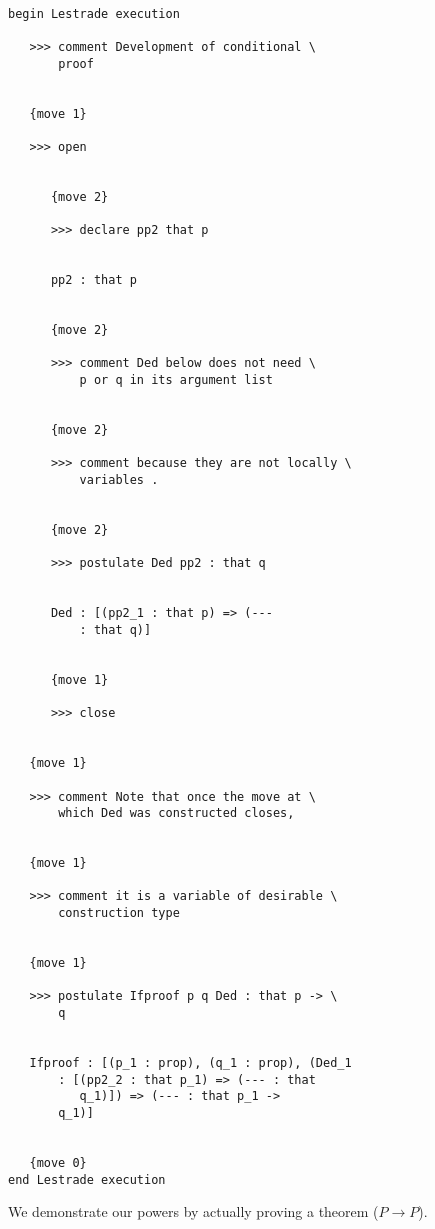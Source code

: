 \documentclass[12pt]{article}
\begin{document}
\begin{verbatim}

begin Lestrade execution

   >>> comment Development of conditional \
       proof


   {move 1}

   >>> open


      {move 2}

      >>> declare pp2 that p


      pp2 : that p


      {move 2}

      >>> comment Ded below does not need \
          p or q in its argument list


      {move 2}

      >>> comment because they are not locally \
          variables .


      {move 2}

      >>> postulate Ded pp2 : that q


      Ded : [(pp2_1 : that p) => (--- 
          : that q)]


      {move 1}

      >>> close


   {move 1}

   >>> comment Note that once the move at \
       which Ded was constructed closes,


   {move 1}

   >>> comment it is a variable of desirable \
       construction type


   {move 1}

   >>> postulate Ifproof p q Ded : that p -> \
       q


   Ifproof : [(p_1 : prop), (q_1 : prop), (Ded_1 
       : [(pp2_2 : that p_1) => (--- : that 
          q_1)]) => (--- : that p_1 -> 
       q_1)]


   {move 0}
end Lestrade execution
\end{verbatim}

We demonstrate our powers by actually proving a theorem ($P \rightarrow P$).
\end{document}
